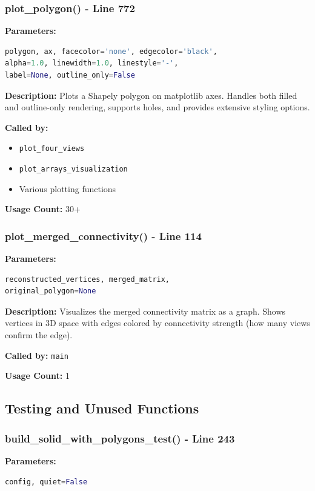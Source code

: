 \documentclass[11pt,a4paper]{article}
\begin{document}
\subsubsection{plot\_polygon() - Line 772}
\textbf{Parameters:}
\begin{lstlisting}[language=Python]
polygon, ax, facecolor='none', edgecolor='black', 
alpha=1.0, linewidth=1.0, linestyle='-', 
label=None, outline_only=False
\end{lstlisting}

\textbf{Description:}
Plots a Shapely polygon on matplotlib axes. Handles both filled and outline-only rendering, supports holes, and provides extensive styling options.

\textbf{Called by:}
\begin{itemize}
    \item \texttt{plot\_four\_views}
    \item \texttt{plot\_arrays\_visualization}
    \item Various plotting functions
\end{itemize}

\textbf{Usage Count:} 30+

\subsubsection{plot\_merged\_connectivity() - Line 114}
\textbf{Parameters:}
\begin{lstlisting}[language=Python]
reconstructed_vertices, merged_matrix, 
original_polygon=None
\end{lstlisting}

\textbf{Description:}
Visualizes the merged connectivity matrix as a graph. Shows vertices in 3D space with edges colored by connectivity strength (how many views confirm the edge).

\textbf{Called by:} \texttt{main}

\textbf{Usage Count:} 1

\subsection{Testing and Unused Functions}

\subsubsection{build\_solid\_with\_polygons\_test() - Line 243}
\textbf{Parameters:}
\begin{lstlisting}[language=Python]
config, quiet=False
\end{lstlisting}
\end{document}
